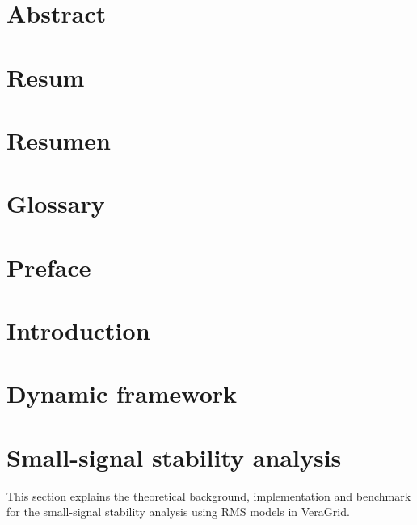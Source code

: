 \documentclass[a4paper, 11pt, titlepage, twoside]{article}
\begin{document}

\section*{Abstract}\label{Abstract}

\newpage
\section*{Resum}\label{Resum}

\newpage
\section*{Resumen}\label{Resumen}


\cleardoublepage

\tableofcontents

\newpage
\listoffigures

\newpage
\begingroup
\setlength{\parskip}{0pt}
\listoftables %
\endgroup

\setlength{\abovedisplayskip}{5pt} %
\setlength{\belowdisplayskip}{5pt} %

\newpage
\section*{Glossary}

\newpage

\section*{Preface}

\newpage

\section{Introduction}\label{Introduction}

\newpage

\section{Dynamic framework}\label{dynamic}

\newpage

\section{Small-signal stability analysis}\label{SmallSignal}
This section explains the theoretical background, implementation and benchmark for the small-signal stability analysis
using RMS models in VeraGrid.
\end{document}
